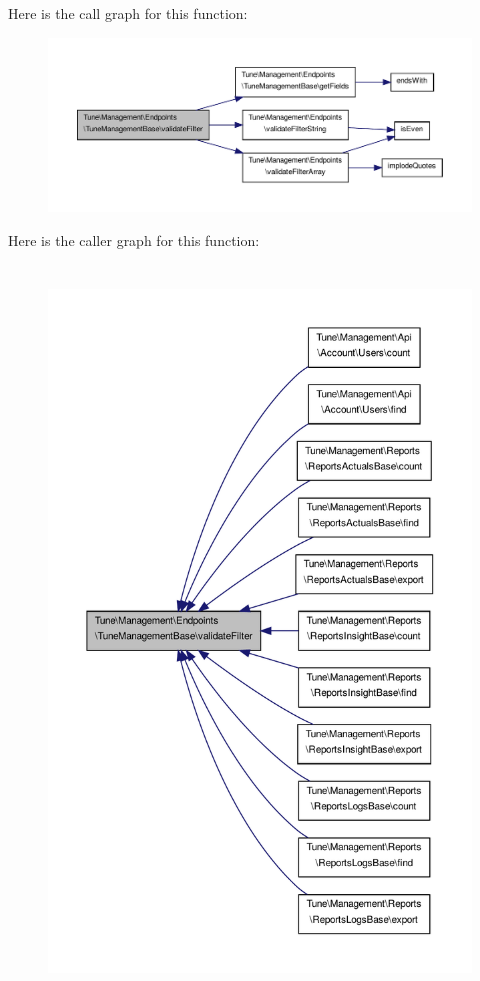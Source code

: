 Here is the call graph for this function\-:
\nopagebreak
\begin{figure}[H]
\begin{center}
\leavevmode
\includegraphics[width=350pt]{classTune_1_1Management_1_1Endpoints_1_1TuneManagementBase_a98d644de253513032083a5504fc2f412_cgraph}
\end{center}
\end{figure}




Here is the caller graph for this function\-:
\nopagebreak
\begin{figure}[H]
\begin{center}
\leavevmode
\includegraphics[height=550pt]{classTune_1_1Management_1_1Endpoints_1_1TuneManagementBase_a98d644de253513032083a5504fc2f412_icgraph}
\end{center}
\end{figure}


